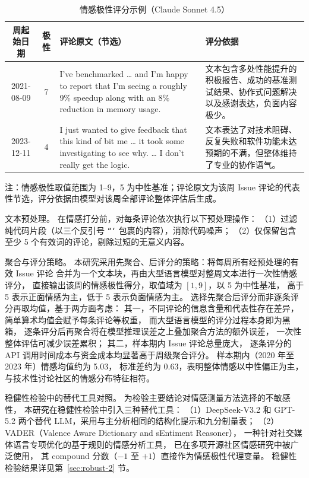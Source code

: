 \documentclass[
    type = master, %
    degree = professional,        %
    decl-page,  %
    twoside,                %
    fontset = fandol %
  ]{njuthesis}
\begin{document}
\begin{table}[htbp]
    \centering
    \caption{情感极性评分示例（Claude Sonnet 4.5）}
    \label{tab:sentiment-example}
    \small
    \begin{tabularx}{\textwidth}{c c >{\raggedright\arraybackslash}X >{\raggedright\arraybackslash}X}
        \toprule
        周起始日期 & 极性 & 评论原文（节选） & 评分依据 \\
        \midrule
        2021-08-09 & 7 &
        I've benchmarked \ldots{} and I'm happy to report that I'm seeing a roughly 9\% speedup along with an 8\% reduction in memory usage. &
        文本包含多处性能提升的积极报告、成功的基准测试结果、协作式问题解决以及感谢表达，负面内容极少。 \\
        \midrule
        2023-12-11 & 4 &
        I just wanted to give feedback that this kind of bit me \ldots{} it took some investigating to see why. \ldots{} I don't really get the logic. &
        文本表达了对技术阻碍、反复失败和软件功能未达预期的不满，但整体维持了专业的协作语气。 \\
        \bottomrule
    \end{tabularx}
    \par\vspace{4pt}
    {\small 注：情感极性取值范围为 1--9，5 为中性基准；评论原文为该周 Issue 评论的代表性节选，评分依据由模型对该周全部评论整体评估后生成。}
\end{table}

文本预处理。
在情感打分前，对每条评论依次执行以下预处理操作：
（1）过滤纯代码片段（以三个反引号 \texttt{```} 包裹的内容），消除代码噪声；
（2）仅保留包含至少 5 个有效词的评论，剔除过短的无意义内容。

聚合与评分策略。
本研究采用先聚合、后评分的策略：将每周所有经预处理的有效 Issue 评论
合并为一个文本块，再由大型语言模型对整周文本进行一次性情感评分，
直接输出该周的情感极性得分，取值域为 $[1, 9]$，以 5 为中性基准，
高于 5 表示正面情感为主，低于 5 表示负面情感为主。
选择先聚合后评分而非逐条评分再取均值，基于两方面考虑：
其一，不同评论的信息含量和代表性存在差异，
简单算术均值会赋予每条评论等权重，
而大型语言模型的评分过程本身即为黑箱，
逐条评分后再聚合将在模型推理误差之上叠加聚合方法的额外误差，
一次性整体评估可减少误差累积；
其二，样本期内 Issue 评论总量庞大，
逐条评分的 API 调用时间成本与资金成本均显著高于周级聚合评分。
样本期内（2020 年至 2023 年）情感均值约为 5.03，
标准差约为 0.63，表明整体情感以中性偏正为主，
与技术性讨论社区的情感分布特征相符。

稳健性检验中的替代工具对照。
为检验主要结论对情感测量方法选择的不敏感性，
本研究在稳健性检验中引入三种替代工具：
（1）DeepSeek-V3.2 和 GPT-5.2 两个替代 LLM，采用与主分析相同的结构化提示和九分制量表；
（2）VADER（Valence Aware Dictionary and sEntiment Reasoner），
一种针对社交媒体语言专项优化的基于规则的情感分析工具\cite{hutto2014vader}，
已在多项开源社区情感研究中被广泛使用\cite{yang2021differential}，
其 compound 分数（$-1$ 至 $+1$）直接作为情感极性代理变量。
稳健性检验结果详见第~\ref{sec:robust-2} 节。
\end{document}
